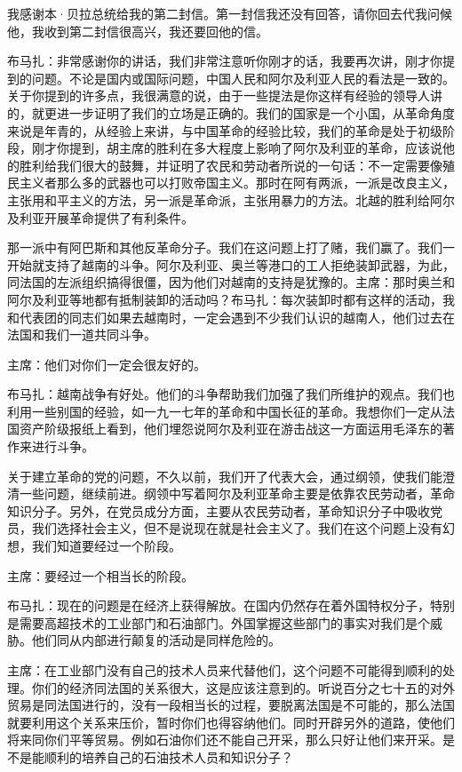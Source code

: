 我感谢本·贝拉总统给我的第二封信。第一封信我还没有回答，请你回去代我问候他，我收到第二封信很高兴，我还要回他的信。

布马扎：非常感谢你的讲话，我们非常注意听你刚才的话，我要再次讲，刚才你提到的问题。不论是国内或国际问题，中国人民和阿尔及利亚人民的看法是一致的。关于你提到的许多点，我很满意的说，由于一些提法是你这样有经验的领导人讲的，就更进一步证明了我们的立场是正确的。我们的国家是一个小国，从革命角度来说是年青的，从经验上来讲，与中国革命的经验比较，我们的革命是处于初级阶段，刚才你提到，胡主席的胜利在多大程度上影响了阿尔及利亚的革命，应该说他的胜利给我们很大的鼓舞，并证明了农民和劳动者所说的一句话：不一定需要像殖民主义者那么多的武器也可以打败帝国主义。那时在阿有两派，一派是改良主义，主张用和平主义的方法，另一派是革命派，主张用暴力的方法。北越的胜利给阿尔及利亚开展革命提供了有利条件。

那一派中有阿巴斯和其他反革命分子。我们在这问题上打了赌，我们赢了。我们一开始就支持了越南的斗争。阿尔及利亚、奥兰等港口的工人拒绝装卸武器，为此，同法国的左派组织搞得很僵，因为他们对越南的支持是犹豫的。主席：那时奥兰和阿尔及利亚等地都有抵制装卸的活动吗？布马扎：每次装卸时都有这样的活动，我和代表团的同志们如果去越南时，一定会遇到不少我们认识的越南人，他们过去在法国和我们一道共同斗争。

主席：他们对你们一定会很友好的。

布马扎：越南战争有好处。他们的斗争帮助我们加强了我们所维护的观点。我们也利用一些别国的经验，如一九一七年的革命和中国长征的革命。我想你们一定从法国资产阶级报纸上看到，他们埋怨说阿尔及利亚在游击战这一方面运用毛泽东的著作来进行斗争。

关于建立革命的党的问题，不久以前，我们开了代表大会，通过纲领，使我们能澄清一些问题，继续前进。纲领中写着阿尔及利亚革命主要是依靠农民劳动者，革命知识分子。另外，在党员成分方面，主要从农民劳动者，革命知识分子中吸收党员，我们选择社会主义，但不是说现在就是社会主义了。我们在这个问题上没有幻想，我们知道要经过一个阶段。

主席：要经过一个相当长的阶段。

布马扎：现在的问题是在经济上获得解放。在国内仍然存在着外国特权分子，特别是需要高超技术的工业部门和石油部门。外国掌握这些部门的事实对我们是个威胁。他们同从内部进行颠复的活动是同样危险的。

主席：在工业部门没有自己的技术人员来代替他们，这个问题不可能得到顺利的处理。你们的经济同法国的关系很大，这是应该注意到的。听说百分之七十五的对外贸易是同法国进行的，没有一段相当长的过程，要脱离法国是不可能的，那么法国就要利用这个关系来压价，暂时你们也得容纳他们。同时开辟另外的道路，使他们将来同你们平等贸易。例如石油你们还不能自己开采，那么只好让他们来开采。是不是能顺利的培养自己的石油技术人员和知识分子？

